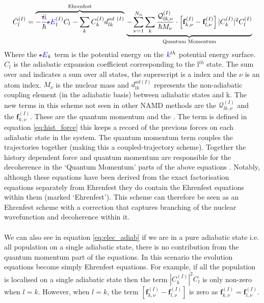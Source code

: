 \begin{dmath}
  \dot{C}_{l}^{(I)} =
  \overbrace{
    -\frac{\mremove{i}\madd{\im}}{\hbar} \mremove{\epsilon}\madd{E}_l^{(I)} C_{l}
    - \sum_k C_k^{(I)} d_{lk}^{ad \ (I)}
  }^{\text{Ehrenfest}}
  \\
  \underbrace{
    - \sum_{\nu=1}^{N_n}\sum_{k} \frac{\mathcal{Q}_{lk, \nu}^{(I)}}{\hbar M_\nu} \cdot \left[ \mathbf{f}_{k,\nu}^{(I)} - \mathbf{f}_{l,\nu}^{(I)} \right] |C_{k}^{(I)}|^2 C_{l}^{(I)}
  }_{\text{Quantum Momentum}}
  \label{eq:elec_adiab}
\end{dmath}
Where the $\mremove{\epsilon}\madd{E}_k$ term is the potential energy on the $\textcolor{blue}{k}^{th}$ potential energy surface. $C_l$ is the adiabatic expansion coefficient corresponding to the l$^{th}$ state. The sum over and indicates a sum over all states, the  superscript is a  index and the $\nu$ is an atom index. $M_{\nu}$ is  the nuclear mass and $d_{lk}^{ad (I)}$ represents the non-adiabatic coupling element (in the adiabatic basis) between adiabatic states and k.
The  new terms in this scheme not seen in other NAMD methods are the $\mathcal{Q}_{lk, \nu}^{(I)}$ and the $\mathbf{f}_{k, \nu}^{(I)}$. These are the quantum momentum and the . The  term is defined in equation \eqref{eq:hist_force} this keeps a record of the previous forces on each adiabatic state in the system. The quantum momentum term couples the trajectories together (making this a coupled-trajectory scheme).  Together the history dependent force and quantum momentum are responsible for the decoherence in the `Quantum Momentum' parts of the above equations \cite{gossel_coupled-trajectory_2018}. Notably, although these equations have been derived from the exact factorisation equations separately from Ehrenfest they do contain the Ehrenfest equations within them (marked `Ehrenfest'). This scheme can therefore be seen as an Ehrenfest scheme with a correction that captures branching of the nuclear wavefunction and decoherence within it.
\\\\
We can also see in equation \eqref{eq:elec_adiab} if we are in a pure adiabatic state i.e. all population on a single adiabatic state, there is no contribution from the quantum momentum part of the equations. In this scenario the evolution equations become simply Ehrenfest equations. For example, if all the population is localised on a single adiabatic state then the term $|C_{k}^{(I)}|^2 C_{l}$ is only non-zero when $l = k$. However, when $l = k$, the term $\left[ \mathbf{f}_{k,\nu}^{(I)} - \mathbf{f}_{l,\nu}^{(I)} \right]$ is zero as $\mathbf{f}_{k,\nu}^{(I)} = \mathbf{f}_{l,\nu}^{(I)}$.
